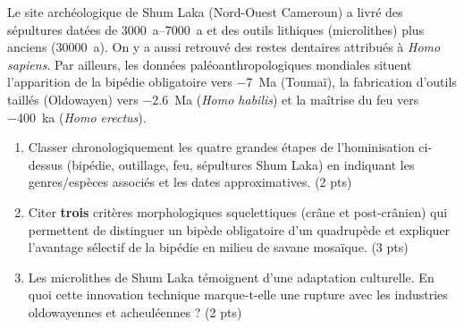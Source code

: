\documentclass[11pt]{article}
\begin{document}
\begin{exercice}
Le site archéologique de Shum Laka (Nord-Ouest Cameroun) a livré des sépultures datées de \SIrange{3000}{7000}{a} et des outils lithiques (microlithes) plus anciens (\SI{30000}{a}). On y a aussi retrouvé des restes dentaires attribués à \textit{Homo sapiens}.
Par ailleurs, les données paléoanthropologiques mondiales situent l'apparition de la bipédie obligatoire vers \SI{-7}{Ma} (Toumaï), la fabrication d'outils taillés (Oldowayen) vers \SI{-2.6}{Ma} (\textit{Homo habilis}) et la maîtrise du feu vers \SI{-400}{ka} (\textit{Homo erectus}).

\begin{enumerate}
    \item Classer chronologiquement les quatre grandes étapes de l'hominisation ci-dessus (bipédie, outillage, feu, sépultures Shum Laka) en indiquant les genres/espèces associés et les dates approximatives. \hfill (2 pts)
    \item Citer \textbf{trois} critères morphologiques squelettiques (crâne et post-crânien) qui permettent de distinguer un bipède obligatoire d'un quadrupède et expliquer l'avantage sélectif de la bipédie en milieu de savane mosaïque. \hfill (3 pts)
    \item Les microlithes de Shum Laka témoignent d'une adaptation culturelle. En quoi cette innovation technique marque-t-elle une rupture avec les industries oldowayennes et acheuléennes ? \hfill (2 pts)
\end{enumerate}
\end{exercice}
\end{document}
